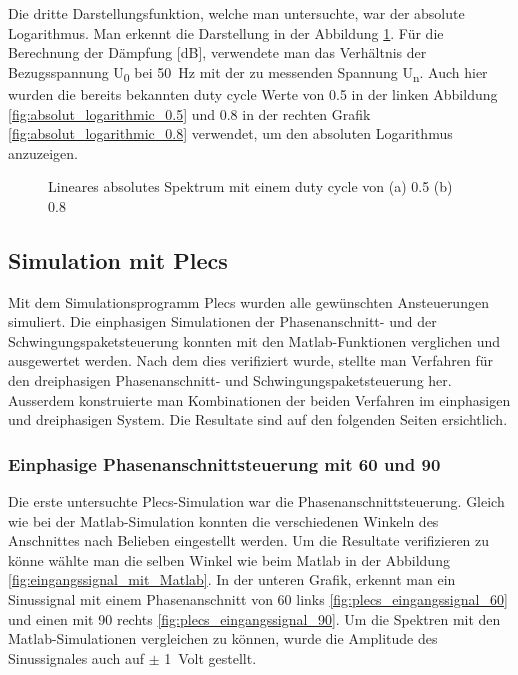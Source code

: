 Die dritte Darstellungsfunktion, welche man untersuchte, war der absolute Logarithmus. Man erkennt die Darstellung in der Abbildung \ref{fig:absolut_logaritmic_matlab}. Für die Berechnung der Dämpfung [dB], verwendete man das Verhältnis der Bezugsspannung U\textsubscript{0} bei \SI{50}{Hz} mit der zu messenden Spannung U\textsubscript{n}. Auch hier wurden die bereits bekannten duty cycle Werte von 0.5 in der linken Abbildung  \ref{fig:absolut_logarithmic_0.5} und 0.8 in der rechten Grafik \ref{fig:absolut_logarithmic_0.8} verwendet, um den absoluten Logarithmus anzuzeigen.


\begin{figure}[ht!]
	\centering
	\qquad
	\caption{Lineares absolutes Spektrum mit einem duty cycle von (a) 0.5 (b) 0.8}
	\label{fig:absolut_logaritmic_matlab}
\end{figure}
\newpage
\subsection{Simulation mit Plecs}

Mit dem Simulationsprogramm Plecs wurden alle gewünschten Ansteuerungen simuliert. Die einphasigen Simulationen der Phasenanschnitt- und der Schwingungspaketsteuerung konnten mit den Matlab-Funktionen verglichen und ausgewertet werden. Nach dem dies verifiziert wurde, stellte man Verfahren für den dreiphasigen Phasenanschnitt- und Schwingungspaketsteuerung her. Ausserdem konstruierte man Kombinationen der beiden Verfahren im einphasigen und dreiphasigen System. Die Resultate sind auf den folgenden Seiten ersichtlich. \\

\subsubsection{Einphasige Phasenanschnittsteuerung mit 60 \textdegree \hspace{0.02cm} und 90 \textdegree}

Die erste untersuchte Plecs-Simulation war die Phasenanschnittsteuerung. Gleich wie bei der Matlab-Simulation konnten die verschiedenen Winkeln des Anschnittes nach Belieben eingestellt werden. Um die Resultate verifizieren zu könne wählte man die selben Winkel wie beim Matlab in der Abbildung \ref{fig:eingangssignal_mit_Matlab}. In der unteren Grafik, erkennt man ein Sinussignal mit einem Phasenanschnitt von 60\textdegree \hspace{0.02cm} links \ref{fig:plecs_eingangssignal_60} und einen mit 90\textdegree \hspace{0.02cm} rechts \ref{fig:plecs_eingangssignal_90}. Um die Spektren mit den Matlab-Simulationen vergleichen zu können, wurde die Amplitude des Sinussignales auch auf $\pm$ \SI{1}{Volt} gestellt.  

